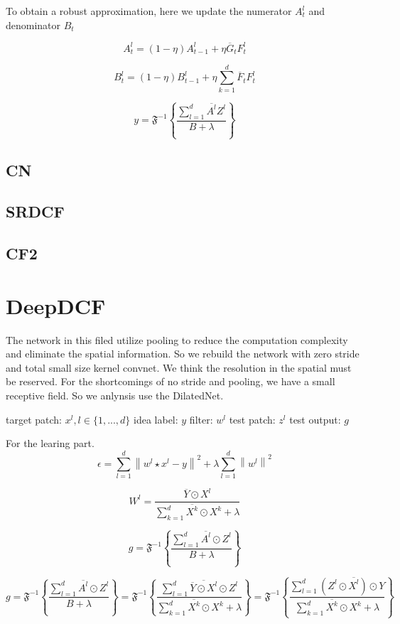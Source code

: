 \documentclass[11pt]{article}
\begin{document}
To obtain a robust approximation, here we update the numerator $A_ {t}^{l} $ and denominator $ B_{t} $

$$
A_{t}^{l} = (1-\eta )A_{t-1}^{l}+\eta \overline{G}_{t}F_{t}^{l}
$$

$$
B_{t}^{l} = (1-\eta )B_{t-1}^{l}+\eta \sum_{k=1}^{d}\overline{F}_{t}F_{t}^{l}
$$

$$
y=\mathfrak{F}^{-1}\left\{ \frac{\sum_{l=1}^{d}\overline{A^{l}}Z^{l}}{B+\lambda}\right\}
$$


	\subsection{CN}


	\subsection{SRDCF}
	\subsection{CF2}

	
	\section{DeepDCF}
	
 The network in this filed utilize pooling to reduce the computation complexity and eliminate the spatial information.
 So we rebuild the network with zero stride and total small size kernel convnet. We think the resolution in the spatial must be reserved. For the shortcomings of no stride and pooling, we have a small receptive field. So we anlynsis use the DilatedNet.
	
	
target patch: $ x^{l} ,l\in \{ 1,...,d \} $
idea label: $ y $
filter: $ w^{l} $
test patch: $ z^{l} $
test output: $ g $

For the learing part.
$$
\epsilon =  \sum_{l=1}^{d}\left \| w^{l}\star x^{l}-y \right \|^{2} +\lambda \sum_{l=1}^{d}\left\|w^{l} \right\|^{2}
$$

$$
W^{l}=\frac{\overline{Y} \odot X^{l}}{\sum_{k=1}^{d}\overline{X^{k}} \odot X^{k}+\lambda}
$$


$$
g=\mathfrak{F}^{-1}\left\{ \frac{\sum_{l=1}^{d}\overline{A^{l}} \odot Z^{l}}{B+\lambda}\right\}
$$

$$
g=\mathfrak{F}^{-1}\left\{ \frac{\sum_{l=1}^{d}\overline{A^{l}} \odot Z^{l}}{B+\lambda}\right\} 
=\mathfrak{F}^{-1}\left\{\frac{ \sum_{l=1}^{d}\overline{\overline{Y} \odot X^{l}} \odot Z^{l}}{\sum_{k=1}^{d}\overline{X^{k}} \odot X^{k}+\lambda}\right\} 
=\mathfrak{F}^{-1}\left\{\frac{ \sum_{l=1}^{d}(Z^{l} \odot \overline{X^{l}}) \odot Y}{\sum_{k=1}^{d}\overline{X^{k}} \odot X^{k}+\lambda}\right\}
$$
\end{document}
